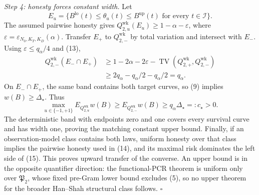 \emph{Step 4: honesty forces constant width.}
Let
\[
 E_u=\{B^{\mathrm{lo}}(t)\le\theta_u(t)\le B^{\mathrm{up}}(t)
       \text{ for every }t\in\mathcal I\}.
\]
The assumed pairwise honesty gives
\(Q_{2,u}^{\mathrm{wk}}(E_u)\ge1-\alpha-\varepsilon\), where
\(\varepsilon=\varepsilon_{N_0,K_T,K_D}(\alpha)\).
Transfer \(E_+\) to \(Q_{2,-}^{\mathrm{wk}}\) by total variation and intersect with \(E_-\).  Using \(\varepsilon\le q_\alpha/4\) and (13),
\[
 \begin{aligned}
 Q_{2,-}^{\mathrm{wk}}(E_-\cap E_+)
 &\ge1-2\alpha-2\varepsilon
      -\operatorname{TV}(Q_{2,+}^{\mathrm{wk}},Q_{2,-}^{\mathrm{wk}})\\
 &\ge2q_\alpha-q_\alpha/2-q_\alpha/2=q_\alpha.          \tag{14}
 \end{aligned}
\]
On \(E_-\cap E_+\), the same band contains both target curves, so (9) implies \(w(B)\ge\Delta_\star\).  Thus
\[
 \max_{u\in\{-1,+1\}}E_{Q_{2,u}^{\mathrm{wk}}}w(B)
 \ge E_{Q_{2,-}^{\mathrm{wk}}}w(B)
 \ge q_\alpha\Delta_\star=:c_\star>0.                   \tag{15}
\]
The deterministic band with endpoints zero and one covers every survival curve and has width one, proving the matching constant upper bound.  Finally, if an observation-model class contains both laws, uniform honesty over that class implies the pairwise honesty used in (14), and its maximal risk dominates the left side of (15).  This proves upward transfer of the converse.  An upper bound is in the opposite quantifier direction: the functional-PCR theorem is uniform only over \(\mathfrak P_2\), whose fixed pre-Gram lower bound excludes (5), so no upper theorem for the broader Han--Shah structural class follows. \(\square\)